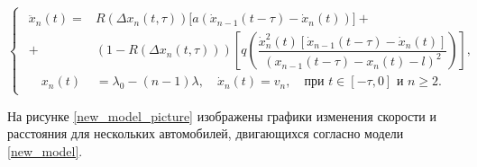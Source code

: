 \documentclass[12pt, a4paper]{extarticle}
\numberwithin{equation}{section}
\numberwithin{figure}{section}
\begin{document}
\begin{equation} \label{new_model} 
\begin{cases}
\begin{split}
\ddot{x}_n(t)= &R(\Delta x_n(t,\tau))\bigg[ a(\dot{x}_{n-1}(t-\tau)-\dot{x}_n(t))\bigg]  +\\+& (1-R(\Delta x_n(t,\tau)))\left[  q\left(  \dfrac{\dot{x}_n^2(t)\left[  \dot{x}_{n-1}(t-\tau) - \dot{x}_n(t) \right]}{(x_{n-1}(t-\tau)-x_n(t)-l)^2}\right) \right], \\
 \quad x_n(t)&=\lambda_0-(n-1)\lambda, \quad \dot{x}_n(t)=v_{n}, \quad \text{при } t \in [-\tau,0] \text{ и } n\geq2.
\end{split}
\end{cases}
\end{equation}

На рисунке \ref{new_model_picture} изображены графики изменения скорости и расстояния для нескольких автомобилей, двигающихся согласно модели \eqref{new_model}.
\end{document}
